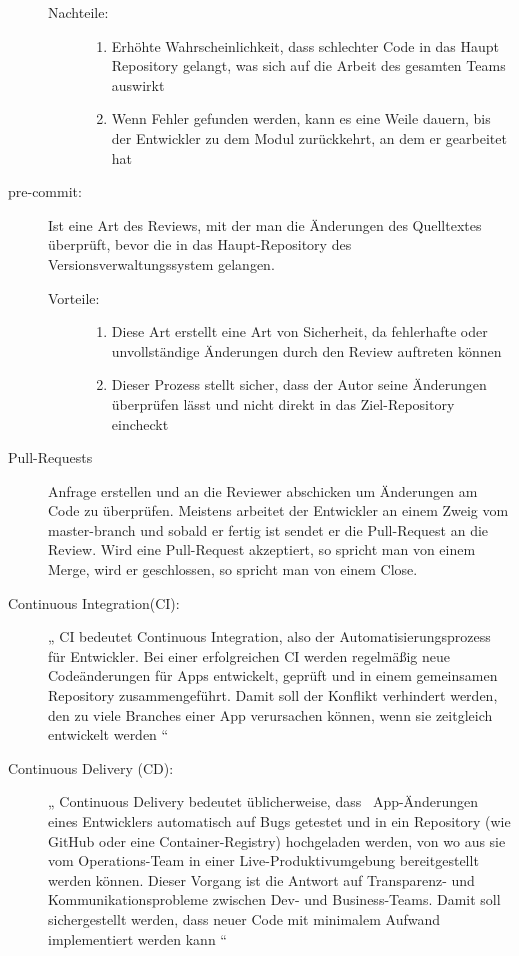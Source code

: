 \begin{description}
\begin{description}
			\item[Nachteile:] \hfill
			\begin{enumerate}
				\item Erhöhte Wahrscheinlichkeit, dass schlechter Code in das Haupt Repository gelangt, was sich auf die Arbeit des gesamten Teams auswirkt
				\item Wenn Fehler gefunden werden, kann es eine Weile dauern, bis der Entwickler zu dem Modul zurückkehrt, an dem er gearbeitet hat
			\end{enumerate}
		\end{description}
		
		
	\item [pre-commit:]
		Ist eine Art des Reviews, mit der man die Änderungen des Quelltextes überprüft, bevor die in das Haupt-Repository des Versionsverwaltungssystem gelangen.
		\begin{description}
			\item [Vorteile:] \hfill
			\begin{enumerate}
				\item Diese Art erstellt eine Art von Sicherheit, da fehlerhafte oder unvollständige Änderungen durch den Review auftreten können
				\item Dieser Prozess stellt sicher, dass der Autor seine Änderungen überprüfen lässt und nicht direkt in das Ziel-Repository eincheckt
			\end{enumerate}
		\end{description}
		
	\item [Pull-Requests]
		Anfrage erstellen und an die Reviewer abschicken um Änderungen am Code zu überprüfen. Meistens arbeitet der Entwickler an einem Zweig vom master-branch und sobald er fertig ist 			sendet er die Pull-Request an die Review. Wird eine Pull-Request akzeptiert, so spricht man von einem Merge, wird er geschlossen, so spricht man von einem Close.
	
	\item [Continuous Integration(CI):]
		„ CI bedeutet Continuous Integration, also der Automatisierungsprozess für Entwickler. Bei einer erfolgreichen CI werden regelmäßig neue Codeänderungen für Apps entwickelt, 				geprüft und in einem gemeinsamen Repository zusammengeführt. Damit soll der Konflikt verhindert werden, den zu viele Branches einer App verursachen können, wenn sie zeitgleich 			entwickelt werden “ \cite{RedHat}
			
	\item [Continuous Delivery (CD):]
		„ Continuous Delivery bedeutet üblicherweise, dass \, App-Änderungen eines Entwicklers automatisch auf Bugs getestet und in ein Repository (wie GitHub oder eine Container-Registry) 		hochgeladen werden, von wo aus sie vom Operations-Team in einer Live-Produktivumgebung bereitgestellt werden können. Dieser Vorgang ist die Antwort auf Transparenz- und 					Kommunikationsprobleme zwischen Dev- und Business-Teams. Damit soll sichergestellt werden, dass neuer Code mit minimalem Aufwand implementiert werden kann “ \cite{RedHat}
		

\end{description}
